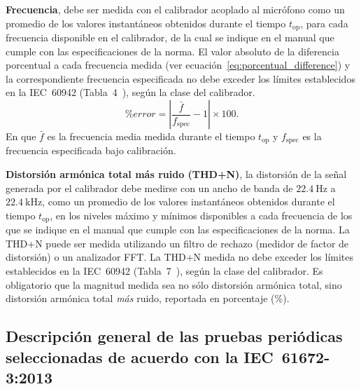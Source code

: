\textbf{Frecuencia}, debe ser medida con el calibrador acoplado al micrófono como un promedio de los valores instantáneos obtenidos durante el tiempo $t_{\mathrm{op}}$, para cada frecuencia disponible en el calibrador, de la cual se indique en el manual que cumple con las especificaciones de la norma.
El valor absoluto de la diferencia porcentual a cada frecuencia medida (ver ecuación~\ref{eq:porcentual_difference}) y la correspondiente frecuencia especificada no debe exceder los límites establecidos en la \mbox{IEC 60942} (\mbox{Tabla 4}~\citeyear{IEC_TC29_2017}), según la clase del calibrador.
%
\begin{equation}
    \label{eq:porcentual_difference}
    \%error = \left|\frac{\bar{f}}{f_{\mathrm{spec}}} - 1\right| \times 100.
\end{equation}
%
En que $\bar{f}$ es la frecuencia media medida durante el tiempo $t_{\mathrm{op}}$ y $f_{\mathrm{spec}}$ es la frecuencia especificada bajo calibración.

\textbf{Distorsión armónica total más ruido (THD+N)}, la distorsión de la señal generada por el calibrador debe medirse con un ancho de banda de $\qty{22.4}{\Hz}$ a $\qty{22.4}{\kHz}$, como un promedio de los valores instantáneos obtenidos durante el tiempo $t_{\mathrm{op}}$, en los niveles máximo y mínimos disponibles a cada frecuencia de los que se indique en el manual que cumple con las especificaciones de la norma.
La THD+N puede ser medida utilizando un filtro de rechazo (medidor de factor de distorsión) o un analizador FFT. La THD+N medida no debe exceder los límites establecidos en la \mbox{IEC 60942} (\mbox{Tabla 7}~\citeyear{IEC_TC29_2017}), según la clase del calibrador.
Es obligatorio que la magnitud medida sea no sólo distorsión armónica total, sino distorsión armónica total \emph{más} ruido, reportada en porcentaje ($\%$).

\subsection{Descripción general de las pruebas periódicas seleccionadas de acuerdo con la \mbox{IEC 61672-3:2013}}
\label{subsec:slm_calibration_description}

